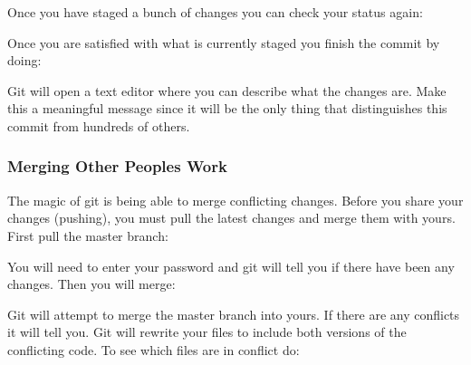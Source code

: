  Once you have staged a bunch of changes you can check your status again\+: 
\begin{DoxyCode}{0}
\DoxyCodeLine{}
\DoxyCodeLine{}
\DoxyCodeLine{}
\DoxyCodeLine{}
\DoxyCodeLine{}
\end{DoxyCode}
 Once you are satisfied with what is currently staged you finish the commit by doing\+: 
\begin{DoxyCode}{0}
\end{DoxyCode}
 Git will open a text editor where you can describe what the changes are. Make this a meaningful message since it will be the only thing that distinguishes this commit from hundreds of others.\hypertarget{index_autotoc_md5}{}\subsubsection{Merging Other People\textquotesingle{}s Work}\label{index_autotoc_md5}
The magic of git is being able to merge conflicting changes. Before you share your changes (pushing), you must pull the latest changes and merge them with yours. First pull the master branch\+: 
\begin{DoxyCode}{0}
\end{DoxyCode}
 You will need to enter your password and git will tell you if there have been any changes. Then you will merge\+: 
\begin{DoxyCode}{0}
\end{DoxyCode}
 Git will attempt to merge the master branch into yours. If there are any conflicts it will tell you. Git will rewrite your files to include both versions of the conflicting code. To see which files are in conflict do\+: 
\begin{DoxyCode}{0}
\end{DoxyCode}
